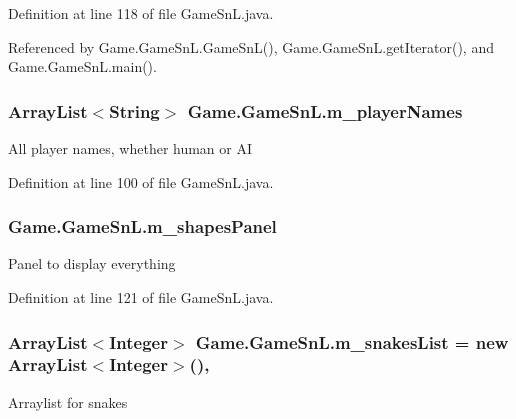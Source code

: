 Definition at line 118 of file Game\+Sn\+L.\+java.



Referenced by Game.\+Game\+Sn\+L.\+Game\+Sn\+L(), Game.\+Game\+Sn\+L.\+get\+Iterator(), and Game.\+Game\+Sn\+L.\+main().

\hypertarget{class_game_1_1_game_sn_l_a0faf146bfc9f0bd5814b3b3c71c00a20}{}
\subsubsection[{m\+\_\+player\+Names}]{\setlength{\rightskip}{0pt plus 5cm}Array\+List$<$String$>$ Game.\+Game\+Sn\+L.\+m\+\_\+player\+Names\hspace{0.3cm}{\ttfamily [private]}}\label{class_game_1_1_game_sn_l_a0faf146bfc9f0bd5814b3b3c71c00a20}
All player names, whether human or A\+I 

Definition at line 100 of file Game\+Sn\+L.\+java.

\hypertarget{class_game_1_1_game_sn_l_af35fcedb0f8206713981e01068c3f281}{}
\subsubsection[{m\+\_\+shapes\+Panel}]{ Game.\+Game\+Sn\+L.\+m\+\_\+shapes\+Panel\hspace{0.3cm}{\ttfamily [private]}}\label{class_game_1_1_game_sn_l_af35fcedb0f8206713981e01068c3f281}
Panel to display everything 

Definition at line 121 of file Game\+Sn\+L.\+java.

\hypertarget{class_game_1_1_game_sn_l_a904b75e06e59aa1a9c028a948f98e33e}{}
\subsubsection[{m\+\_\+snakes\+List}]{\setlength{\rightskip}{0pt plus 5cm}Array\+List$<$Integer$>$ Game.\+Game\+Sn\+L.\+m\+\_\+snakes\+List = new Array\+List$<$Integer$>$()\hspace{0.3cm}{\ttfamily [static]}, {\ttfamily [private]}}\label{class_game_1_1_game_sn_l_a904b75e06e59aa1a9c028a948f98e33e}
Arraylist for snakes 


